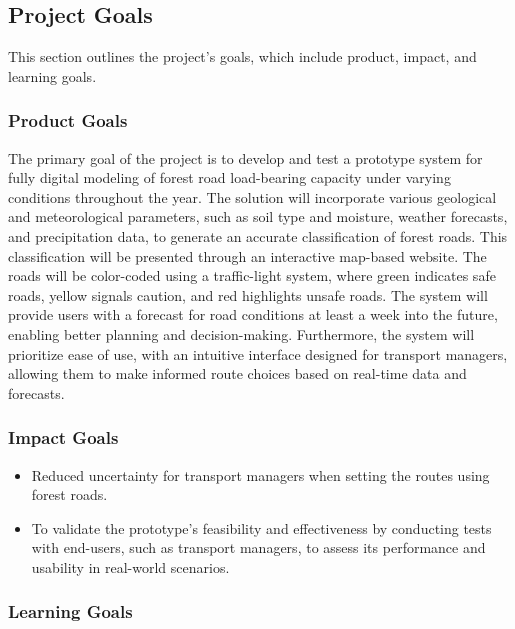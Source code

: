 \newpage

\subsection{Project Goals}
This section outlines the project's goals, which include product, impact, and learning goals.
\subsubsection{Product Goals}
The primary goal of the project is to develop and test a prototype system for fully digital modeling of forest road load-bearing capacity under varying conditions throughout the year. The solution will incorporate various geological and meteorological parameters, such as soil type and moisture, weather forecasts, and precipitation data, to generate an accurate classification of forest roads. This classification will be presented through an interactive map-based website. The roads will be color-coded using a traffic-light system, where green indicates safe roads, yellow signals caution, and red highlights unsafe roads. The system will provide users with a forecast for road conditions at least a week into the future, enabling better planning and decision-making. Furthermore, the system will prioritize ease of use, with an intuitive interface designed for transport managers, allowing them to make informed route choices based on real-time data and forecasts. 

\subsubsection{Impact Goals}
\begin{itemize}
    \item Reduced uncertainty for transport managers when setting the routes using forest roads.
    \item To validate the prototype's feasibility and effectiveness by conducting tests with end-users, such as transport managers, to assess its performance and usability in real-world scenarios.
\end{itemize}

\subsubsection{Learning Goals}

